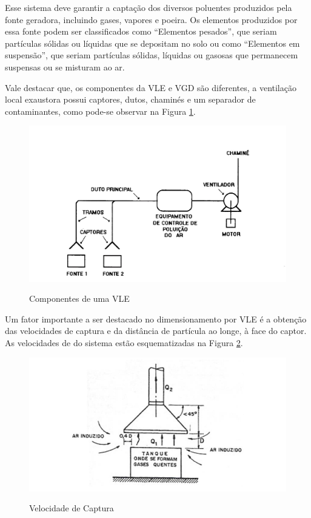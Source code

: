 \documentclass[acronym,symbols]{fei}
\begin{document}
Esse sistema deve garantir a captação dos diversos poluentes produzidos pela fonte geradora, incluindo gases, vapores e poeira. Os elementos produzidos por essa fonte podem ser classificados como “Elementos pesados”, que seriam partículas sólidas ou líquidas que se depositam no solo ou como “Elementos em suspensão”, que seriam partículas sólidas, líquidas ou gasosas que permanecem suspensas ou se misturam ao ar.

Vale destacar que, os componentes da VLE e VGD são diferentes, a ventilação local exaustora possui captores, dutos, chaminés e um separador de contaminantes, como pode-se observar na Figura \ref{fig: compnentes da VLE}.

 \begin{figure}[!htb] %
 \centering
    \caption{Componentes de uma VLE}
    \includegraphics[width=0.7\linewidth]{Imagens/VLE.jpeg}
    \label{fig: compnentes da VLE}
 \end{figure}

Um fator importante a ser destacado no dimensionamento por VLE é a obtenção das velocidades de captura e da distância de partícula ao longe, à face do captor. As velocidades de do sistema estão esquematizadas na Figura \ref{fig: velocidade de captura}.

\begin{figure}[!htb] 
 \centering
    \caption{Velocidade de Captura}
    \includegraphics[width=0.8\linewidth]{Imagens/velocidade captura.png}
    \label{fig: velocidade de captura}
\end{figure}
\end{document}
